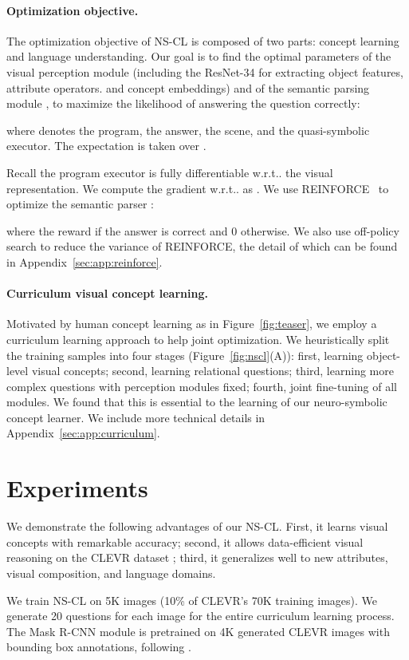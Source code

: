 \documentclass{article} \usepackage{iclr2019_conference,times}
\makeatletter
\newcommand{\fig}[1]{Figure~\ref{#1}}
\DeclareRobustCommand\onedot{\futurelet\@let@token\@onedot}
\def\@onedot{\ifx\@let@token.\else.\null\fi\xspace}
\def\wrt{w.r.t\onedot} \def\dof{d.o.f\onedot}
\newcommand{\modelfull}{neuro-symbolic concept learner\xspace}
\newcommand{\model}{NS-CL\xspace}
\newcommand{\myparagraph}[1]{\vspace{-3pt}\paragraph{#1}}
\makeatother
\begin{document}
\paragraph{Optimization objective.}

The optimization objective of \model is composed of two parts: concept learning and language understanding. Our goal is to find the optimal parameters  of the visual perception module  (including the ResNet-34 for extracting object features, attribute operators. and concept embeddings) and  of the semantic parsing module , to maximize the likelihood of answering the question  correctly:

where  denotes the program,  the answer,  the scene, and  the quasi-symbolic executor. The expectation is taken over .

Recall the program executor is fully differentiable \wrt the visual representation. We compute the gradient \wrt  as
. We use REINFORCE~\citep{Williams1992Simple} to optimize  the semantic parser :

where the reward  if the answer is correct and 0 otherwise. We also use off-policy search to reduce the variance of REINFORCE, the detail of which can be found in Appendix~\ref{sec:app:reinforce}.

\myparagraph{Curriculum visual concept learning.}
\label{subsec:curriculum}
Motivated by human concept learning as in \fig{fig:teaser}, we employ a curriculum learning approach to help joint optimization. We heuristically split the training samples into four stages (\fig{fig:nscl}(A)): first, learning object-level visual concepts; second, learning relational questions; third, learning more complex questions with perception modules fixed; fourth, joint fine-tuning of all modules. We found that this is essential to the learning of our \modelfull.
We include more technical details in Appendix~\ref{sec:app:curriculum}.
\section{Experiments}

We demonstrate the following advantages of our \model. First, it learns visual concepts with remarkable accuracy; second, it allows data-efficient visual reasoning on the CLEVR dataset \citep{Johnson2017CLEVR}; third, it generalizes well to new attributes, visual composition, and language domains.

We train \model on 5K images (10\% of CLEVR's 70K training images). We generate 20 questions for each image for the entire curriculum learning process. The Mask R-CNN module is pretrained on 4K generated CLEVR images with bounding box annotations, following \citet{kexin}.
\end{document}
